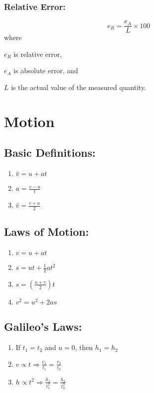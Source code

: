 \documentclass[a4paper]{report}
\begin{document}
        \subsection{Relative Error: }
            \begin{equation}
                e_R = \frac{e_A}{L} \times 100%
            \end{equation}
            where
            \begin{description}
                \item $e_R$ is relative error,
                \item $e_A$ is absolute error, and
                \item $L$ is the actual value of the measured quantity.
            \end{description}


\chapter{Motion}
    \section{Basic Definitions: }
        \begin{enumerate}
            \item $ \bar{v} = u + at $
            \item $ a = \frac{v - u}{t} $
            \item $ \bar{v} = \frac{v + u}{2} $
        \end{enumerate}
    \section{Laws of Motion: }
        \begin{enumerate}
            \item $ v = u + at $
            \item $ s = ut + \frac{1}{2}at^2 $
            \item $ s = ( \frac{u + v}{2} ) t $
            \item $ v^2 = u^2 + 2as $
        \end{enumerate}
    \section{Galileo's Laws: }
            \begin{enumerate}
                \item If \(t_{1} = t_{2} \) and \(u = 0 \), then \( h_{1} = h_{2} \)
                \item $ v \propto t \Rightarrow \frac{v_1}{t_1} = \frac{v_2}{t_2} $
                \item $ h \propto t^2 \Rightarrow \frac{h_1}{t_1^2} = \frac{h_2}{t_2^2} $
            \end{enumerate}
\end{document}

